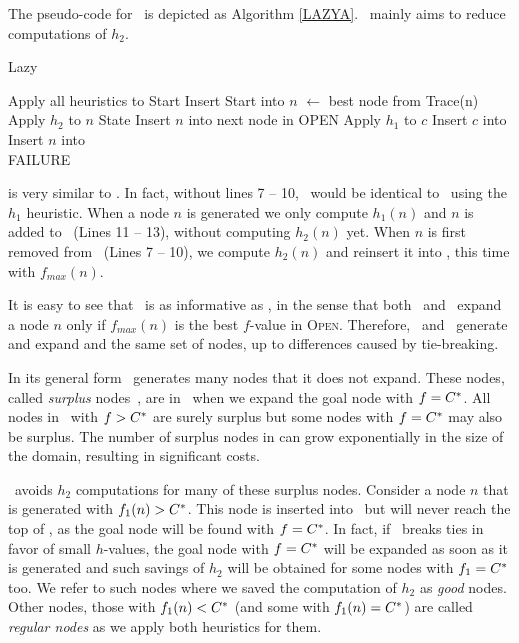 The pseudo-code for  \lazyastar~is depicted as Algorithm \ref{LAZYA}.
\lazyastar~mainly aims to reduce computations of $h_2$.
\begin{algorithm}[h]
\caption{Lazy \astar}
\begin{algorithmic}[1]
    \State Apply all heuristics to Start
    \State Insert Start into \OPEN
        \State $n$ $\gets$ best node from \OPEN
            \Return Trace(n)
        \EndIf
            \State Apply $h_2$ to $n$
            State Insert $n$ into \OPEN
			 \Comment next node in OPEN
        \EndIf
            \State Apply $h_1$ to $c$
            \State Insert $c$ into \OPEN
        \EndFor
        \State Insert $n$ into \CLOSED
    \EndWhile  \\
    \Return FAILURE
\EndProcedure
\end{algorithmic}
\label{LAZYA}
\end{algorithm}
\lazyastar is very similar to \astar.
In fact, without lines 7 -- 10, \lazyastar~would be identical to
\astar~using the $h_1$ heuristic.
When a node $n$ is generated we only compute $h_1(n)$ and $n$ is added to
\OPEN ~(Lines 11 -- 13), without computing $h_2(n)$ yet.
When $n$ is first removed from \OPEN~(Lines 7 -- 10), we compute $h_2(n)$ and
reinsert it into \OPEN, this time with $f_{max}(n)$.

It is easy to see that \lazyastar~is as informative as \astarmax, in
the sense that both \astarmax~and \lazyastar~expand a node $n$ only
if $f_{max}(n)$ is the best $f$-value in \textsc{Open}.  Therefore,
\lazyastar~and \astarmax~generate and expand and the same set of
nodes, up to differences caused by tie-breaking.

In its general form \astar~generates many nodes that it does not expand. These
nodes, called {\em surplus} nodes~\cite{Felner2012}, are in \OPEN~when we
expand the goal node with $f=C^\ast$. All nodes in \OPEN~with $f>C^\ast$ are
surely surplus but some nodes with $f=C^\ast$ may also be surplus. The number
of surplus nodes in \OPEN can grow exponentially in the size of the domain, resulting in
significant costs.

\lazyastar~avoids $h_2$ computations for many of these surplus nodes. Consider
a node $n$ that is generated with $f_1(n) > C^\ast$. This node is inserted
into \OPEN~but will never reach the top of \OPEN, as the goal node will be found
with $f=C^\ast$. In fact, if \OPEN~breaks ties in favor of small $h$-values,
the goal node with $f=C^\ast$ will be expanded as soon as it is generated and such
savings of $h_2$ will be obtained for some nodes with $f_1=C^\ast$ too. We
refer to such nodes where we saved the computation of $h_2$ as {\em good} nodes. Other nodes,
those with $f_1(n) < C^\ast$ (and some with $f_1(n) = C^\ast$) are called
{\em regular nodes} as we apply both heuristics for them.

